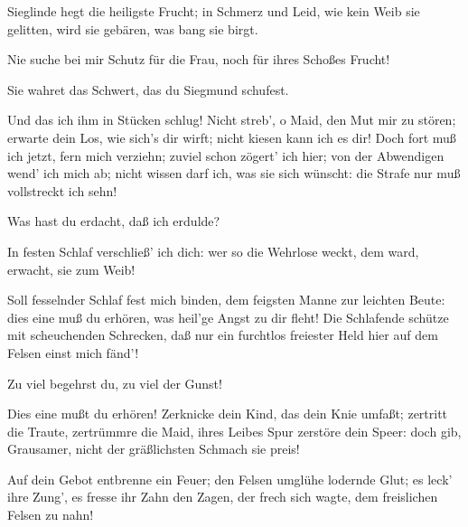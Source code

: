 \begin{drama}

Sieglinde hegt die heiligste Frucht;
in Schmerz und Leid, wie kein Weib sie gelitten,
wird sie gebären,
was bang sie birgt.
 

\Wotanspeaks
Nie suche bei mir Schutz für die Frau,
noch für ihres Schoßes Frucht!
 

\Brunnhildespeaks


Sie wahret das Schwert, das du Siegmund schufest.
 

\Wotanspeaks


Und das ich ihm in Stücken schlug!
Nicht streb', o Maid, den Mut mir zu stören;
erwarte dein Los, wie sich's dir wirft;
nicht kiesen kann ich es dir!
Doch fort muß ich jetzt, fern mich verziehn;
zuviel schon zögert' ich hier;
von der Abwendigen wend' ich mich ab;
nicht wissen darf ich, was sie sich wünscht:
die Strafe nur muß vollstreckt ich sehn!
 

\Brunnhildespeaks
Was hast du erdacht, daß ich erdulde?
 

\Wotanspeaks
In festen Schlaf verschließ' ich dich:
wer so die Wehrlose weckt,
dem ward, erwacht, sie zum Weib!
 

\Brunnhildespeaks


Soll fesselnder Schlaf fest mich binden,
dem feigsten Manne zur leichten Beute:
dies eine muß du erhören,
was heil'ge Angst zu dir fleht!
Die Schlafende schütze mit scheuchenden Schrecken,
daß nur ein furchtlos freiester Held
hier auf dem Felsen einst mich fänd'!
 

\Wotanspeaks
Zu viel begehrst du, zu viel der Gunst!
 

\Brunnhildespeaks


Dies eine mußt du erhören!
Zerknicke dein Kind, das dein Knie umfaßt;
zertritt die Traute, zertrümmre die Maid,
ihres Leibes Spur zerstöre dein Speer:
doch gib, Grausamer, nicht
der gräßlichsten Schmach sie preis!


Auf dein Gebot entbrenne ein Feuer;
den Felsen umglühe lodernde Glut;
es leck' ihre Zung', es fresse ihr Zahn
den Zagen, der frech sich wagte,
dem freislichen Felsen zu nahn!
 
\Wotanspeaks



\end{drama}
